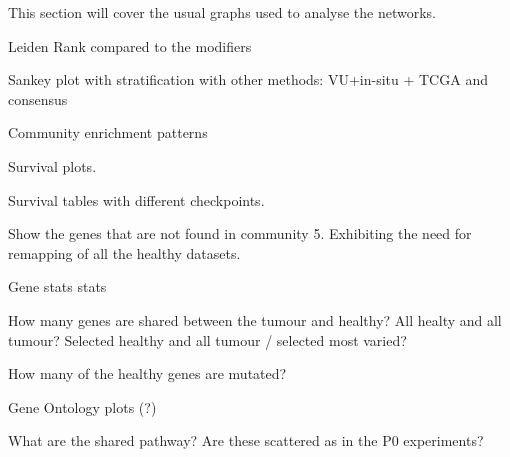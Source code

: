 This section will cover the usual graphs used to analyse the networks.
\begin{todolist}
    \item[\done] Leiden Rank compared to the modifiers
    \item[\done] Sankey plot with stratification with other methods: VU+in-situ + TCGA and consensus
    \item[\done] Community enrichment patterns
    \item [\done] Survival plots.
    \item Survival tables with different checkpoints.
    \item Show the genes that are not found in community 5. Exhibiting the need for remapping of all the healthy datasets.
    \item Gene stats stats
    \begin{todolist}
        \item How many genes are shared between the tumour and healthy? All healty and all tumour? Selected healthy and all tumour / selected most varied?
        \item How many of the healthy genes are mutated?
    \end{todolist}
    \item [\wontfix] Gene Ontology plots (?)
    \item  [\wontfix] What are the shared pathway? Are these scattered as in the P0 experiments?
\end{todolist}



